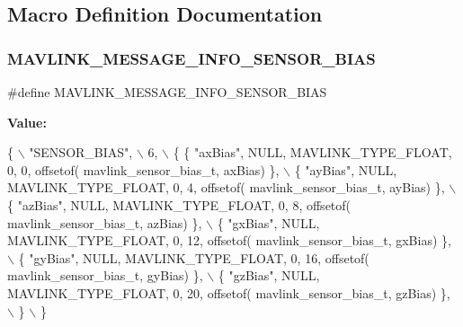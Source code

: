 \subsection{Macro Definition Documentation}
\mbox{\label{mavlink__msg__sensor__bias_8h_ad26fb859a1a94fb326416e48937e24b9}} 
\subsubsection{M\+A\+V\+L\+I\+N\+K\+\_\+\+M\+E\+S\+S\+A\+G\+E\+\_\+\+I\+N\+F\+O\+\_\+\+S\+E\+N\+S\+O\+R\+\_\+\+B\+I\+AS}
{\footnotesize\ttfamily \#define M\+A\+V\+L\+I\+N\+K\+\_\+\+M\+E\+S\+S\+A\+G\+E\+\_\+\+I\+N\+F\+O\+\_\+\+S\+E\+N\+S\+O\+R\+\_\+\+B\+I\+AS}

{\bfseries Value\+:}
\begin{DoxyCode}
\{ \(\backslash\)
    \textcolor{stringliteral}{"SENSOR\_BIAS"}, \(\backslash\)
    6, \(\backslash\)
    \{  \{ \textcolor{stringliteral}{"axBias"}, NULL, MAVLINK_TYPE_FLOAT, 0, 0, offsetof(
      mavlink_sensor_bias_t, axBias) \}, \(\backslash\)
         \{ \textcolor{stringliteral}{"ayBias"}, NULL, MAVLINK_TYPE_FLOAT, 0, 4, offsetof(
      mavlink_sensor_bias_t, ayBias) \}, \(\backslash\)
         \{ \textcolor{stringliteral}{"azBias"}, NULL, MAVLINK_TYPE_FLOAT, 0, 8, offsetof(
      mavlink_sensor_bias_t, azBias) \}, \(\backslash\)
         \{ \textcolor{stringliteral}{"gxBias"}, NULL, MAVLINK_TYPE_FLOAT, 0, 12, offsetof(
      mavlink_sensor_bias_t, gxBias) \}, \(\backslash\)
         \{ \textcolor{stringliteral}{"gyBias"}, NULL, MAVLINK_TYPE_FLOAT, 0, 16, offsetof(
      mavlink_sensor_bias_t, gyBias) \}, \(\backslash\)
         \{ \textcolor{stringliteral}{"gzBias"}, NULL, MAVLINK_TYPE_FLOAT, 0, 20, offsetof(
      mavlink_sensor_bias_t, gzBias) \}, \(\backslash\)
         \} \(\backslash\)
\}
\end{DoxyCode}
\mbox{\label{mavlink__msg__sensor__bias_8h_a712d81727fb74b8ed8aea10b6ad29100}} 
